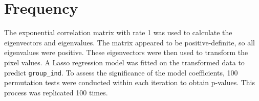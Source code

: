 \documentclass[12pt]{article}
\begin{document}
\section*{Frequency}

The exponential correlation matrix with rate 1 was used to calculate the eigenvectors and eigenvalues. The matrix appeared to be positive-definite, so all eigenvalues were positive. These eigenvectors were then used to transform the pixel values. A Lasso regression model was fitted on the transformed data to predict \texttt{group\_ind}. To assess the significance of the model coefficients, 100 permutation tests were conducted within each iteration to obtain p-values. This process was replicated 100 times.
\end{document}

